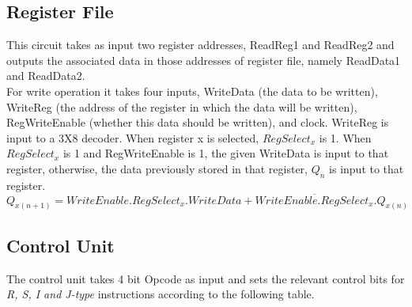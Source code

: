 \documentclass{article}
\begin{document}
\subsection{Register File}
\large
	This circuit takes as input two register addresses, ReadReg1 and ReadReg2 and outputs the associated data in those addresses of register file, namely ReadData1 and ReadData2.\\
	For write operation it takes four inputs, WriteData (the data to be written), WriteReg (the address of the register in which the data will be written), RegWriteEnable (whether this data should be written), and clock. WriteReg is input to a 3X8 decoder. When register x is selected, $RegSelect_{x}$ is 1. When $RegSelect_{x}$ is 1 and RegWriteEnable is 1, the given WriteData is input to that register, otherwise, the data previously stored in that register, $Q_n$ is input to that register. $$ Q_{x(n + 1)} = WriteEnable.RegSelect_x.WriteData + \overline{WriteEnable.RegSelect_x}.Q_{x(n)}$$

\newpage

\subsection{Control Unit}
\large
The control unit takes 4 bit Opcode as input and sets the relevant control bits for \textit{R, S, I and J-type} instructions according to the following table.
\end{document}
